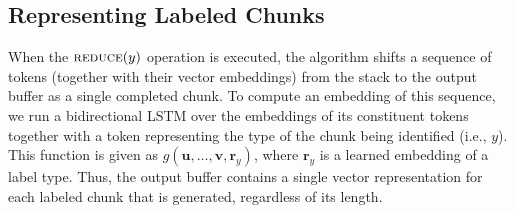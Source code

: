 \documentclass[11pt,letterpaper]{article}
\newcommand{\ignore}[1]{}
\newcommand{\guillaumecomment}[1]{\ignore{\textcolor{orange}{\textbf{[#1 --\textsc{GL}]}}}}
\begin{document}




\subsection{Representing Labeled Chunks}

When the $\textsc{reduce}(y)$ operation is executed, the algorithm shifts a sequence of tokens (together with their vector embeddings) from the stack to the output buffer as a single completed chunk. To compute an embedding of this sequence, we run a bidirectional LSTM over the embeddings of its constituent tokens together with a token representing the type of the chunk being identified (i.e., $y$). This function is given as $g(\mathbf{u}, \ldots, \mathbf{v},\mathbf{r}_y)$, where $\mathbf{r}_y$ is a learned embedding of a label type. Thus, the output buffer contains a single vector representation for each labeled chunk that is generated, regardless of its length.
\end{document}
